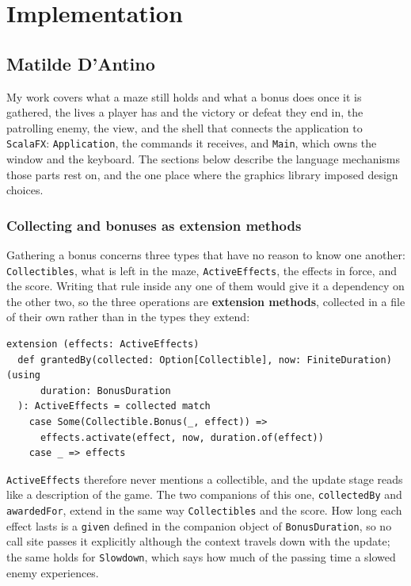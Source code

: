\chapter{Implementation}

\section{Matilde D'Antino}

My work covers what a maze still holds and what a bonus does once it is gathered, the lives a player has and the
victory or defeat they end in, the patrolling enemy, the view, and the shell that connects the application to \texttt{ScalaFX}:
\texttt{Application}, the commands it receives, and \texttt{Main}, which owns the window and the keyboard. The sections below describe the language
mechanisms those parts rest on, and the one place where the graphics library imposed design choices.

\subsection{Collecting and bonuses as extension methods}

Gathering a bonus concerns three types that have no reason to know one another: \texttt{Collectibles}, what is left in the
maze, \texttt{ActiveEffects}, the effects in force, and the score. Writing that rule inside any one of them would give it a dependency on the other
two, so the three operations are \textbf{extension methods}, collected in a file of their own rather than in
the types they extend:

\begin{lstlisting}
extension (effects: ActiveEffects)
  def grantedBy(collected: Option[Collectible], now: FiniteDuration)(using
      duration: BonusDuration
  ): ActiveEffects = collected match
    case Some(Collectible.Bonus(_, effect)) =>
      effects.activate(effect, now, duration.of(effect))
    case _ => effects
\end{lstlisting}

\texttt{ActiveEffects} therefore never mentions a collectible, and the update stage reads like a description of the game. The two companions of this one,
\texttt{collectedBy} and \texttt{awardedFor}, extend in the same way \texttt{Collectibles} and the score. How long
each effect lasts is a \texttt{given} defined in the companion object of \texttt{BonusDuration}, so no call site
passes it explicitly although the context travels down with the update; the same holds for \texttt{Slowdown}, which
says how much of the passing time a slowed enemy experiences.


